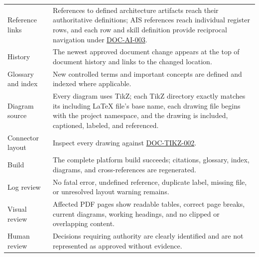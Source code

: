 \begin{tabularx}{\linewidth}{L{3.5cm}Y}
Reference links & References to defined architecture artifacts reach their authoritative definitions; AIS references reach individual register rows, and each row and skill definition provide reciprocal navigation under \hyperref[Requirement:DOCAI003]{DOC-AI-003}.\\
History & The newest approved document change appears at the top of document history and links to the changed location.\\
Glossary and index & New controlled terms and important concepts are defined and indexed where applicable.\\
Diagram source & Every diagram uses TikZ; each TikZ directory exactly matches its including LaTeX file's base name, each drawing file begins with the project namespace, and the drawing is included, captioned, labeled, and referenced.\\
Connector layout & Inspect every drawing against \hyperref[Requirement:DOCTIKZ002]{DOC-TIKZ-002}.\\
Build & The complete platform build succeeds; citations, glossary, index, diagrams, and cross-references are regenerated.\\
Log review & No fatal error, undefined reference, duplicate label, missing file, or unresolved layout warning remains.\\
Visual review & Affected PDF pages show readable tables, correct page breaks, current diagrams, working headings, and no clipped or overlapping content.\\
Human review & Decisions requiring authority are clearly identified and are not represented as approved without evidence.\\
\end{tabularx}
\normalsize
